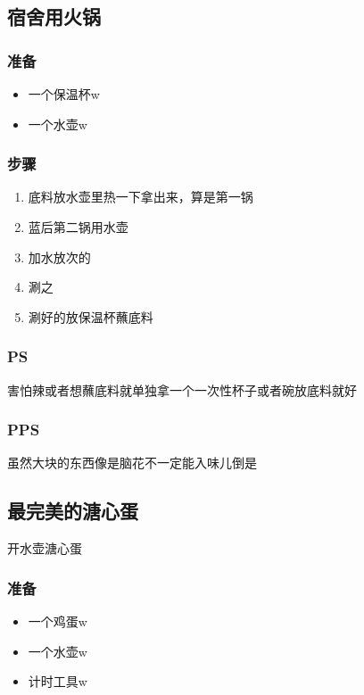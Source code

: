 \documentclass[12pt, a4paper]{ctexart}
\begin{document}
\subsection{宿舍用火锅}
\subsubsection{准备}
\begin{itemize}
    \item{一个保温杯w}
    \item{一个水壶w}
\end{itemize}

\subsubsection{步骤}
\begin{enumerate}[start=0]
    \item{底料放水壶里热一下拿出来，算是第一锅}
    \item{蓝后第二锅用水壶}
    \item{加水放次的}
    \item{涮之}
    \item{涮好的放保温杯蘸底料}
\end{enumerate}

\subsubsection{PS}
害怕辣或者想蘸底料就单独拿一个一次性杯子或者碗放底料就好

\subsubsection{PPS}
虽然大块的东西像是脑花不一定能入味儿倒是

\subsection{最完美的溏心蛋}
开水壶溏心蛋
\subsubsection{准备}
\begin{itemize}
    \item{一个鸡蛋w}
    \item{一个水壶w}
    \item{计时工具w}
\end{itemize}
\end{document}

